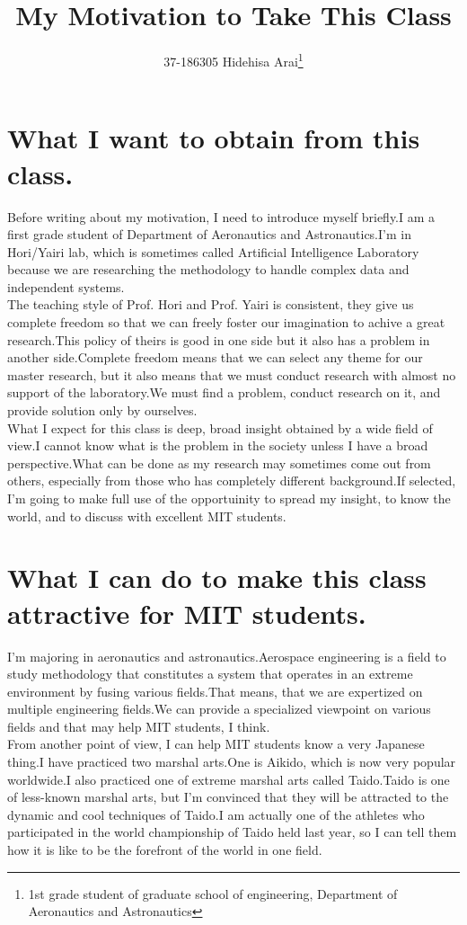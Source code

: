 \documentclass[a4paper,11pt]{article}
\title{My Motivation to Take This Class}
\author{37-186305 Hidehisa Arai\thanks{1st grade student of graduate school of engineering, Department of Aeronautics and Astronautics}}
\begin{document}
\maketitle

\section{What I want to obtain from this class.}
Before writing about my motivation, I need to introduce myself briefly.I am a first grade student of Department of Aeronautics and
Astronautics.I'm in Hori/Yairi lab, which is sometimes called Artificial Intelligence Laboratory because we are researching 
the methodology to handle complex data and independent systems. \\

The teaching style of Prof. Hori and Prof. Yairi is consistent, they give us complete freedom so that we can freely foster our imagination
 to achive a great research.This policy of theirs is good in one side but it also has a problem in another side.Complete freedom means that 
we can select any theme for our master research, but it also means that we must conduct research with almost no support of the laboratory.We must
 find a problem, conduct research on it, and provide solution only by ourselves. \\
 
What I expect for this class is deep, broad insight obtained by a wide field of view.I cannot know what is the problem in the society unless
 I have a broad perspective.What can be done as my research may sometimes come out from others, especially from those who has completely different
 background.If selected, I'm going to make full use of the opportuinity to spread my insight, to know the world, and to discuss with excellent MIT
 students.\\
 

 
\section{What I can do to make this class attractive for MIT students.}
I'm majoring in aeronautics and astronautics.Aerospace engineering is a field to study methodology that constitutes a system that operates in
an extreme environment by fusing various fields.That means, that we are expertized on multiple engineering fields.We can provide a specialized
 viewpoint on various fields and that may help MIT students, I think.\\
 
From another point of view, I can help MIT students know a very Japanese thing.I have practiced two marshal arts.One is Aikido, which is now very
 popular worldwide.I also practiced one of extreme marshal arts called Taido.Taido is one of less-known marshal arts, but I'm convinced that
 they will be attracted to the dynamic and cool techniques of Taido.I am actually one of the athletes who participated in the world championship of
 Taido held last year, so I can tell them how it is like to be the forefront of the world in one field.
\end{document}
